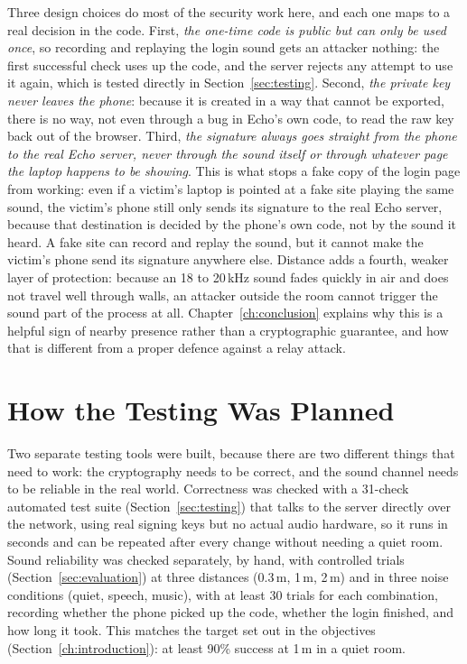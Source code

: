 Three design choices do most of the security work here, and each one maps
to a real decision in the code. First, \emph{the one-time code is public
but can only be used once}, so recording and replaying the login sound
gets an attacker nothing: the first successful check uses up the code, and
the server rejects any attempt to use it again, which is tested directly
in Section~\ref{sec:testing}. Second, \emph{the private key never leaves
the phone}: because it is created in a way that cannot be exported, there
is no way, not even through a bug in Echo's own code, to read the raw key
back out of the browser. Third, \emph{the signature always goes straight
from the phone to the real Echo server, never through the sound itself or
through whatever page the laptop happens to be showing}. This is what
stops a fake copy of the login page from working: even if a victim's
laptop is pointed at a fake site playing the same sound, the victim's
phone still only sends its signature to the real Echo server, because
that destination is decided by the phone's own code, not by the sound it
heard. A fake site can record and replay the sound, but it cannot make the
victim's phone send its signature anywhere else. Distance adds a fourth,
weaker layer of protection: because an 18 to 20\,kHz sound fades quickly in
air and does not travel well through walls, an attacker outside the room
cannot trigger the sound part of the process at all. Chapter~\ref{ch:conclusion}
explains why this is a helpful sign of nearby presence rather than a
cryptographic guarantee, and how that is different from a proper defence
against a relay attack.

\section{How the Testing Was Planned}
\label{sec:methodology-eval}

Two separate testing tools were built, because there are two different
things that need to work: the cryptography needs to be correct, and the
sound channel needs to be reliable in the real world. Correctness was
checked with a 31-check automated test suite (Section~\ref{sec:testing})
that talks to the server directly over the network, using real signing
keys but no actual audio hardware, so it runs in seconds and can be
repeated after every change without needing a quiet room. Sound
reliability was checked separately, by hand, with controlled trials
(Section~\ref{sec:evaluation}) at three distances (0.3\,m, 1\,m, 2\,m) and
in three noise conditions (quiet, speech, music), with at least 30 trials
for each combination, recording whether the phone picked up the code,
whether the login finished, and how long it took. This matches the target
set out in the objectives (Section~\ref{ch:introduction}): at least 90\%
success at 1\,m in a quiet room.
